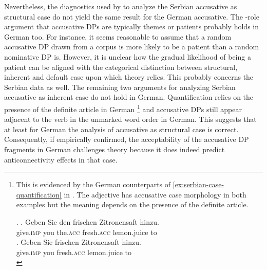 Nevertheless, the diagnostics used by \citet{progovac.etal2006} to analyze the Serbian accusative as structural case do not yield the same result for the German accusative. The \texttheta-role argument that accusative DPs are typically themes or patients probably holds in German too. For instance, it seems reasonable to assume that a random accusative DP drawn from a corpus is more likely to be a patient than a random nominative DP is. However, it is unclear how the gradual likelihood of being a patient can be aligned with the categorical distinction between structural, inherent and default case upon which  theory relies. This probably concerns the Serbian data as well. The remaining two arguments for analyzing Serbian accusative as inherent case do not hold in German. Quantification relies on the presence of the definite article in German%
%
\footnote{This is evidenced by the German counterparts of \ref{ex:serbian-case-quantification} in \Next. The adjective has accusative case morphology in both examples but the meaning depends on the presence of the definite article.

\ex. \ag. Geben Sie den frischen Zitronensaft hinzu.\\
	  give.\textsc{imp} you the.\textsc{acc} fresh.\textsc{acc} lemon.juice to\\
    \bg. Geben Sie frischen Zitronensaft hinzu.\\
	  give.\textsc{imp} you fresh.\textsc{acc} lemon.juice to\\
	  
}\afterfn%
%
and accusative DPs still appear adjacent to the verb in the unmarked word order in German. This suggests that at least for German the analysis of accusative as structural case is correct. Consequently, if empirically confirmed, the acceptability of the accusative DP fragments in German challenges  theory because it does indeed predict anticonnectivity effects in that case.%
